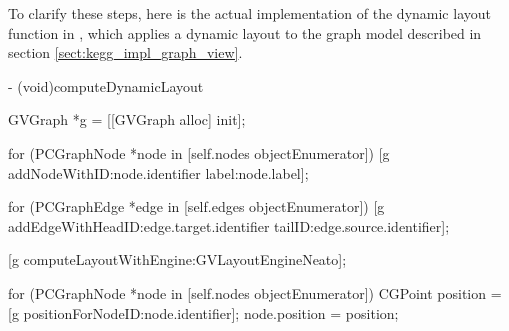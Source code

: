 To clarify these steps, here is the actual implementation of the dynamic layout
function in \keggapp, which applies a dynamic layout to the graph model
described in section \ref{sect:kegg_impl_graph_view}.

\begin{objc}
- (void)computeDynamicLayout
{
    GVGraph *g = [[GVGraph alloc] init];
    
    for (PCGraphNode *node in [self.nodes objectEnumerator]) {
        [g addNodeWithID:node.identifier label:node.label];
    }
    
    for (PCGraphEdge *edge in [self.edges objectEnumerator]) {
        [g addEdgeWithHeadID:edge.target.identifier tailID:edge.source.identifier];
    }
    
    [g computeLayoutWithEngine:GVLayoutEngineNeato];
    
    for (PCGraphNode *node in [self.nodes objectEnumerator]) {
        CGPoint position = [g positionForNodeID:node.identifier];
        node.position = position;
    }
}
\end{objc}
